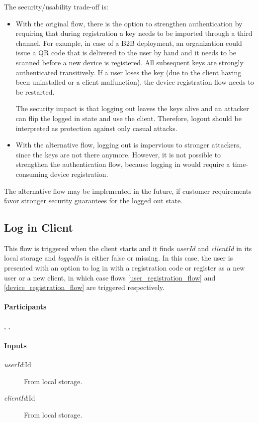 \documentclass[a4paper,10pt,draft]{article}
\newcommand{\userId}{\emph{userId}}
\newcommand{\clientId}{\emph{clientId}}
\newcommand{\loggedIn}{\emph{loggedIn}}
\begin{document}
The security/usability trade-off is:

\begin{itemize}
 \item With the original flow, there is the option to strengthen authentication by requiring that during registration a key needs to be imported through a third channel. For 
example, in case of a B2B deployment, an organization could issue a QR code that is delivered to the user by hand and it needs to be scanned before a new device is registered. All 
subsequent keys are strongly authenticated transitively. If a user loses the key (due to the client having been uninstalled or a client malfunction), the device registration flow 
needs to be restarted.

The security impact is that logging out leaves the keys alive and an attacker can flip the logged in state and use the client. Therefore, logout should be interpreted as 
protection against only casual attacks.
\item With the alternative flow, logging out is impervious to stronger attackers, since the keys are not there anymore. However, it is not possible to strengthen the 
authentication flow, because logging in would require a time-consuming device registration.
\end{itemize}

The alternative flow may be implemented in the future, if customer requirements favor stronger security guarantees for the logged out state.

\subsection{Log in Client}
\label{log_in_client_flow}
This flow is triggered when the client starts and it finds \userId{} and \clientId{} in its local storage and \loggedIn{} is either false or missing. In this case, the user is 
presented with an option to log in with a registration code or register as a new user or a new client, in which case flows \ref{user_registration_flow} and 
\ref{device_registration_flow} are triggered respectively.

\paragraph{Participants} \Client{}, \Server{}, \User{}

\paragraph{Inputs}
\SpecialItem
\begin{description}
 \item[\userId{}:Id] From \Client{} local storage.
 \item[\clientId{}:Id] From \Client{} local storage.
\end{description}
\end{document}
